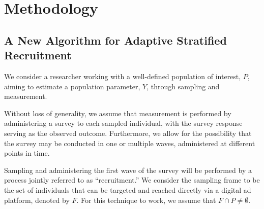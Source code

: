 


\section{Methodology}
\subsection{A New Algorithm for Adaptive Stratified Recruitment}




We consider a researcher working with a well-defined population of interest, $P$, aiming to estimate a population parameter, $Y$, through sampling and measurement.

Without loss of generality, we assume that measurement is performed by administering a survey to each sampled individual, with the survey response serving as the observed outcome. Furthermore, we allow for the possibility that the survey may be conducted in one or multiple waves, administered at different points in time.

Sampling and administering the first wave of the survey will be performed by a process jointly referred to as ``recruitment.'' We consider the sampling frame to be the set of individuals that can be targeted and reached directly via a digital ad platform, denoted by \( F \). For this technique to work, we assume that \( F \cap P \neq \emptyset \).


